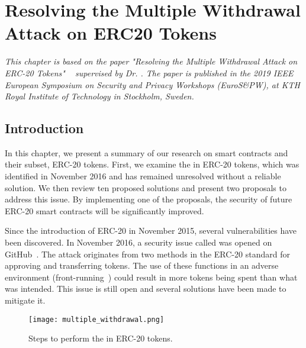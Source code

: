 
\chapter{Resolving the Multiple Withdrawal Attack on ERC20 Tokens}\label{ch:multiple}

\textit{This chapter is based on the paper "Resolving the Multiple Withdrawal Attack on ERC-20 Tokens" ~\cite{MultipleWithdrawal} supervised by Dr. \supv. The paper is published in the 2019 IEEE European Symposium on Security and Privacy Workshops (EuroS\&PW), at KTH Royal Institute of Technology in Stockholm, Sweden.}

\section{Introduction}
In this chapter, we present a summary of our research on smart contracts and their subset, ERC-20 tokens. First, we examine the \mwa in ERC-20 tokens, which was identified in November 2016 and has remained unresolved without a reliable solution. We then review ten proposed solutions and present two proposals to address this issue. By implementing one of the proposals, the security of future ERC-20 smart contracts will be significantly improved.

Since the introduction of ERC-20 in November 2015, several vulnerabilities have been discovered. In November 2016, a security issue called \mwa was opened on GitHub~\cite{AttackVector,Resolution}. The attack originates from two methods in the ERC-20 standard for approving and transferring tokens. The use of these functions in an adverse environment (\eg front-running~\cite{eskandari2019sok}) could result in more tokens being spent than what was intended. This issue is still open and several solutions have been made to mitigate it.

\begin{figure}[t]
	\centering
	\texttt{[image: multiple\_withdrawal.png]}
	\caption[Steps for the \mwa in ERC-20 tokens]{Steps to perform the \mwa in ERC-20 tokens.}
	\label{fig:mwa}
\end{figure}

